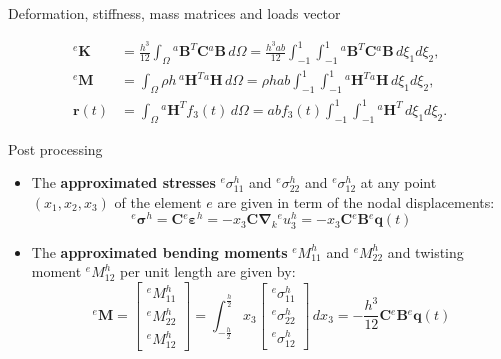 \documentclass[aspectratio=169]{beamer}
\begin{document}
{\begin{frame}{Deformation, stiffness, mass matrices and loads vector}
\begin{itemize}
\begin{align*}
            {}^e\mathbf K & =\frac{h^3}{12}\int_\Omega {}^a\mathbf B^T\mathbf C{}^a\mathbf B \, d\Omega=\frac{h^3ab}{12}\int_{-1}^1\int_{-1}^1 {}^a\mathbf B^T\mathbf C{}^a\mathbf B\, d\xi_1d\xi_2, \\
            {}^e\mathbf M & =\int_\Omega \rho h\, {}^a\mathbf H^T{}^a\mathbf H \, d\Omega=\rho hab \int_{-1}^1\int_{-1}^1 {}^a\mathbf H^T {}^a\mathbf H\, d\xi_1d\xi_2,                              \\
            \mathbf r(t)  & =\int_{\Omega} {}^a\mathbf H^{T}f_3(t)\, d\Omega=ab f_3(t)\int_{-1}^1\int_{-1}^1 {}^a\mathbf H^T \, d\xi_1d\xi_2.
          \end{align*}
  \end{itemize}
\end{frame}
}

\begin{frame}{Post processing}
  \begin{itemize}
    \item The \textbf{approximated stresses} ${}^e\sigma_{11}^h$ and ${}^e\sigma_{22}^h$ and ${}^e\sigma_{12}^h$ at any point $(x_1,x_2,x_3)$ of the element $e$ are given in term of the nodal displacements:
          \vspace{0.3cm}
          $${}^e\boldsymbol{\sigma}^h=\mathbf C{}^e\boldsymbol{\varepsilon}^h=-x_3\mathbf C\boldsymbol{\nabla}_k {}^eu_3^h=-x_3\mathbf C{}^e\mathbf B{}^e\mathbf{q}(t)$$
          \vspace{-0.3cm}
    \item The \textbf{approximated bending moments} ${}^eM_{11}^h$ and ${}^eM_{22}^h$ and twisting moment ${}^eM_{12}^h$ per unit length are given by:
          \vspace{0.3cm}
          \[{}^e\mathbf M=\begin{bmatrix}
              {}^eM_{11}^h \\
              {}^eM_{22}^h \\
              {}^eM_{12}^h
            \end{bmatrix}
            =
            \int_{-\frac{h}{2}}^{\frac{h}{2}} x_3
            \begin{bmatrix}
              {}^e\sigma_{11}^h \\
              {}^e\sigma_{22}^h \\
              {}^e\sigma_{12}^h
            \end{bmatrix}
            \, dx_3 =-\frac{h^3}{12}\boldsymbol{C}{}^e\mathbf B{}^e\mathbf{q}(t)
          \]
  \end{itemize}
\end{frame}
\end{document}
